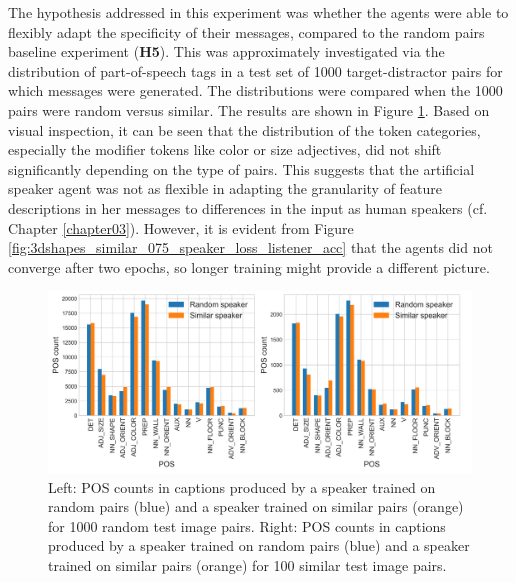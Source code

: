 The hypothesis addressed in this experiment was whether the agents were able to flexibly adapt the specificity of their messages, compared to the random pairs baseline experiment (\textbf{H5}). This was approximately investigated via the distribution of part-of-speech tags in a test set of 1000 target-distractor pairs for which messages were generated. The distributions were compared when the 1000 pairs were random versus similar. The results are shown in Figure \ref{fig:3dshapes_pos}. Based on visual inspection, it can be seen that the distribution of the token categories, especially the modifier tokens like color or size adjectives, did not shift significantly depending on the type of pairs. This suggests that the artificial speaker agent was not as flexible in adapting the granularity of feature descriptions in her messages to differences in the input as human speakers (cf. Chapter \ref{chapter03}). However, it is evident from Figure \ref{fig:3dshapes_similar_075_speaker_loss_listener_acc} that the agents did not converge after two epochs, so longer training might provide a different picture.

\begin{figure}[h]
	\centering
	\includegraphics[width=\linewidth]{images/3dshapes_random_vs_similar_POS_counts.png}
	\caption{Left: POS counts in captions produced by a speaker trained on random pairs (blue) and a speaker trained on similar pairs (orange) for 1000 random test image pairs. Right: POS counts in captions produced by a speaker trained on random pairs (blue) and a speaker trained on similar pairs (orange) for 100 similar test image pairs. }
	\label{fig:3dshapes_pos}
\end{figure}

